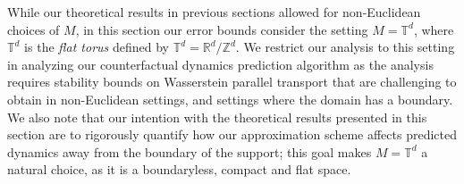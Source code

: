 \documentclass[11pt]{article}
\newcommand{\man}{M}
\begin{document}
While our theoretical results in previous sections allowed for non-Euclidean choices of $\man$, in this section our error bounds consider the setting $\man = \mathbb{T}^d$, where $\mathbb{T}^d$ is the \textit{flat torus} defined by $\mathbb{T}^d = \mathbb{R}^d/\mathbb{Z}^d$. We restrict our analysis to this setting in analyzing our counterfactual dynamics prediction algorithm as the analysis requires stability bounds on Wasserstein parallel transport that are challenging to obtain in non-Euclidean settings, and settings where the domain has a boundary. We also note that our intention with the theoretical results presented in this section are to rigorously quantify how our approximation scheme affects predicted dynamics away from the boundary of the support; this goal makes $\man = \mathbb{T}^d$ a natural choice, as it is a boundaryless, compact and flat space.
\end{document}
